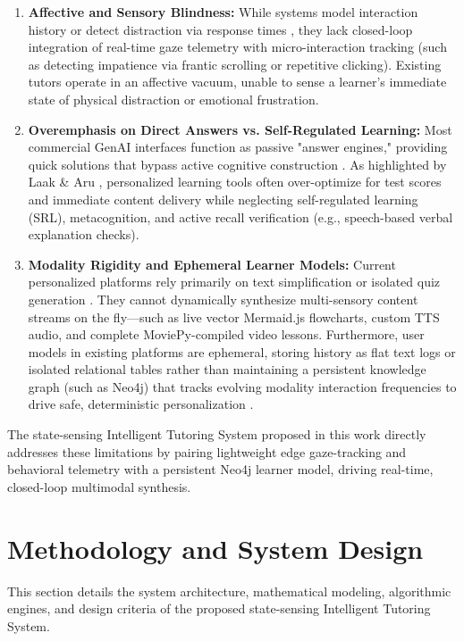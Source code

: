 \documentclass[final,5p,times,twocolumn,authoryear]{elsarticle}
\begin{document}
\begin{enumerate}
    \item \textbf{Affective and Sensory Blindness:} While systems model interaction history \cite{8} or detect distraction via response times \cite{21}, they lack closed-loop integration of real-time gaze telemetry with micro-interaction tracking (such as detecting impatience via frantic scrolling or repetitive clicking). Existing tutors operate in an affective vacuum, unable to sense a learner's immediate state of physical distraction or emotional frustration.
    \item \textbf{Overemphasis on Direct Answers vs. Self-Regulated Learning:} Most commercial GenAI interfaces function as passive "answer engines," providing quick solutions that bypass active cognitive construction \cite{1}. As highlighted by Laak \& Aru \cite{2}, personalized learning tools often over-optimize for test scores and immediate content delivery while neglecting self-regulated learning (SRL), metacognition, and active recall verification (e.g., speech-based verbal explanation checks).
    \item \textbf{Modality Rigidity and Ephemeral Learner Models:} Current personalized platforms rely primarily on text simplification or isolated quiz generation \cite{10, 14}. They cannot dynamically synthesize multi-sensory content streams on the fly—such as live vector Mermaid.js flowcharts, custom TTS audio, and complete MoviePy-compiled video lessons. Furthermore, user models in existing platforms are ephemeral, storing history as flat text logs or isolated relational tables rather than maintaining a persistent knowledge graph (such as Neo4j) that tracks evolving modality interaction frequencies to drive safe, deterministic personalization \cite{13}.
\end{enumerate}

The state-sensing Intelligent Tutoring System proposed in this work directly addresses these limitations by pairing lightweight edge gaze-tracking and behavioral telemetry with a persistent Neo4j learner model, driving real-time, closed-loop multimodal synthesis.

\section{Methodology and System Design}
\label{sec:methodology}

This section details the system architecture, mathematical modeling, algorithmic engines, and design criteria of the proposed state-sensing Intelligent Tutoring System.
\end{document}
